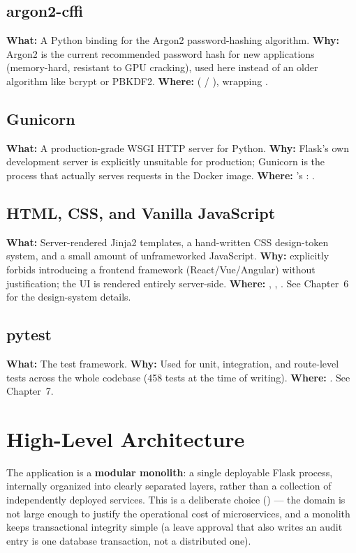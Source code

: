 \subsection*{argon2-cffi}
\textbf{What:} A Python binding for the Argon2 password-hashing
algorithm.
\textbf{Why:} Argon2 is the current recommended password hash for new
applications (memory-hard, resistant to GPU cracking), used here
instead of an older algorithm like bcrypt or PBKDF2.
\textbf{Where:}  ( /
), wrapping .

\subsection*{Gunicorn}
\textbf{What:} A production-grade WSGI HTTP server for Python.
\textbf{Why:} Flask's own development server is explicitly
unsuitable for production; Gunicorn is the process that actually serves
requests in the Docker image.
\textbf{Where:} 's : .

\subsection*{HTML, CSS, and Vanilla JavaScript}
\textbf{What:} Server-rendered Jinja2 templates, a hand-written CSS
design-token system, and a small amount of unframeworked JavaScript.
\textbf{Why:}  explicitly forbids introducing a
frontend framework (React/Vue/Angular) without justification; the UI
is rendered entirely server-side.
\textbf{Where:} , , .
See Chapter~6 for the design-system details.

\subsection*{pytest}
\textbf{What:} The test framework.
\textbf{Why:} Used for unit, integration, and route-level tests across
the whole codebase (458 tests at the time of writing).
\textbf{Where:} . See Chapter~7.

\section{High-Level Architecture}

The application is a \textbf{modular monolith}: a single deployable
Flask process, internally organized into clearly separated layers,
rather than a collection of independently deployed services. This is a
deliberate choice () --- the domain
is not large enough to justify the operational cost of microservices,
and a monolith keeps transactional integrity simple (a leave approval
that also writes an audit entry is one database transaction, not a
distributed one).

